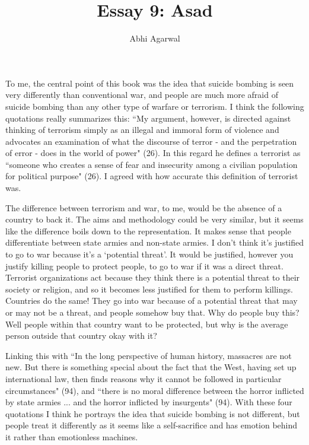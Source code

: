 \documentclass[11pt, oneside]{article}
\title{Essay 9: Asad}
\author{Abhi Agarwal}
\date{}
\begin{document}
\maketitle

\par To me, the central point of this book was the idea that suicide bombing is seen very differently than conventional war, and people are much more afraid of suicide bombing than any other type of warfare or terrorism. I think the following quotations really summarizes this: ``My argument, however, is directed against thinking of terrorism simply as an illegal and immoral form of violence and advocates an examination of what the discourse of terror - and the perpetration of error - does in the world of power" (26). In this regard he defines a terrorist as ``someone who creates a sense of fear and insecurity among a civilian population for political purpose" (26). I agreed with how accurate this definition of terrorist was. 

\par The difference between terrorism and war, to me, would be the absence of a country to back it. The aims and methodology could be very similar, but it seems like the difference boils down to the representation. It makes sense that people differentiate between state armies and non-state armies. I don't think it's justified to go to war because it's a `potential threat'. It would be justified, however you justify killing people to protect people, to go to war if it was a direct threat. Terrorist organizations act because they think there is a potential threat to their society or religion, and so it becomes less justified for them to perform killings. Countries do the same! They go into war because of a potential threat that may or may not be a threat, and people somehow buy that. Why do people buy this? Well people within that country want to be protected, but why is the average person outside that country okay with it? 

\par Linking this with ``In the long perspective of human history, massacres are not new. But there is something special about the fact that the West, having set up international law, then finds reasons why it cannot be followed in particular circumstances" (94), and ``there is no moral difference between the horror inflicted by state armies ... and the horror inflicted by insurgents" (94). With these four quotations I think he portrays the idea that suicide bombing is not different, but people treat it differently as it seems like a self-sacrifice and has emotion behind it rather than emotionless machines. 
\end{document}
